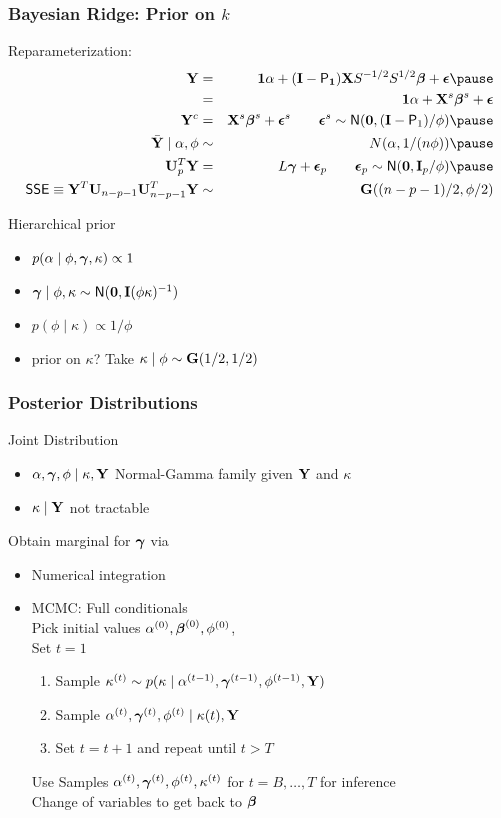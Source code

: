 \documentclass[handout]{beamer}
\begin{document}
\begin{frame}
  \frametitle{Bayesian Ridge: Prior on $k$}
  Reparameterization:
  \begin{eqnarray*}
  \Y  & =  &\one \alpha + (\I - \P_{\one}) \X S^{-1/2} S^{1/2} \b +
  \eps   \pause \\
      & = & \one \alpha + \X^s \b^s + \eps\\
 \Y^c & = & \X^s\b^s + \eps^s \qquad \eps^s \sim \N(\zero, (\I -
 \P_{1})/\phi) \pause \\
 \Ybar \mid \alpha, \phi & \sim & N(\alpha, 1/(n \phi)) \pause \\
 \U_{p}^T \Y & = &  L \g + \eps_p \qquad  \eps_p \sim \N(\zero,
 \I_p/\phi) \pause \\
\SSE \equiv \Y^T \U_{n-p-1} \U_{n-p-1}^T \Y  & \sim & \G( (n-p-1)/2, \phi/2)
  \end{eqnarray*}

Hierarchical prior \pause
\begin{itemize}
\item $p(\alpha \mid \phi, \boldsymbol{\gamma}, \kappa) \propto 1$ \pause
\item $\boldsymbol{\gamma} \mid \phi, \kappa \sim \textsf{N}(\mathbf{0}, \mathbf{I} (\phi \kappa )^{-1})$ \pause
\item $p(\phi \mid \kappa) \propto 1/\phi$
\item prior on $\kappa$?  Take $\kappa \mid \phi \sim  \mathbf{G}(1/2, 1/2)$ \pause
\end{itemize}
\end{frame}
\begin{frame}
  \frametitle{Posterior Distributions}
Joint Distribution
  \begin{itemize}
  \item $\alpha, \boldsymbol{\gamma}, \phi \mid \kappa, \mathbf{Y}$  Normal-Gamma family given $\mathbf{Y}$
    and $\kappa$ \pause
  \item $\kappa \mid \mathbf{Y}$  not tractable \pause
  \end{itemize}
Obtain marginal for  $\boldsymbol{\gamma}$ via  \pause
\begin{itemize}
\item Numerical integration \pause
\item MCMC:  Full conditionals \pause \\  Pick initial values $\alpha^{(0)}, \boldsymbol{\beta}^{(0)},
  \phi^{(0)}$, \pause \\
  Set  $t = 1$
  \begin{enumerate}
  \item Sample $\kappa^{(t)} \sim p(\kappa \mid \alpha^{(t-1)},
    \boldsymbol{\gamma}^{(t-1)}, \phi^{(t-1)}, \mathbf{Y})$ \pause
   \item Sample $\alpha^{(t)}, \boldsymbol{\gamma}^{(t)}, \phi^{(t)} \mid \kappa(t),
     \mathbf{Y}$ \pause
 \item Set $t = t + 1$ and repeat until $t > T$ \pause
  \end{enumerate}
Use Samples  $\alpha^{(t)}, \boldsymbol{\gamma}^{(t)}, \phi^{(t)}, \kappa^{(t)}$ for $t
= B, \ldots, T$ for inference \\
Change of variables to get back to $\boldsymbol{\beta}$
\end{itemize}
\end{frame}
\end{document}
